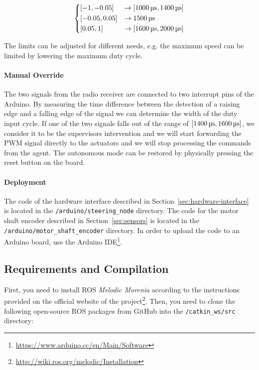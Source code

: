 \[
	\begin{dcases}
		\interval{-1}{-0.05} & \rightarrow \interval{\SI{1000}{\micro\second}}{\SI{1400}{\micro\second}} \\
		\interval{-0.05}{0.05} & \rightarrow \SI{1500}{\micro\second} \\
		\interval{0.05}{1} & \rightarrow \interval{\SI{1600}{\micro\second}}{ \SI{2000}{\micro\second}}
	\end{dcases}
\]

The limits can be adjusted for different needs, e.g. the maximum speed can be limited by lowering the maximum duty cycle.

\paragraph{Manual Override}

The two signals from the radio receiver are connected to two interrupt pins of the Arduino. By measuring the time difference between the detection of a raising edge and a falling edge of the signal we can determine the width of the duty input cycle. If one of the two signals falls out of the range of $\interval{\SI{1400}{\micro\second}}{\SI{1600}{\micro\second}}$, we consider it to be the supervisors intervention and we will start forwarding the \gls*{PWM} signal directly to the actuators and we will stop processing the commands from the agent. The autonomous mode can be restored by physically pressing the reset button on the board.

\paragraph{Deployment}

The code of the hardware interface described in Section~\ref{sec:hardware-interface} is located in the \texttt{/arduino/steering\_node} directory. The code for the motor shaft encoder described in Section~\ref{sec:sensors} is located in the \texttt{/arduino/motor\_\-shaft\_encoder} directory. In order to upload the code to an Arduino board, use the Arduino IDE\footnote{\url{https://www.arduino.cc/en/Main/Software}}.

\subsection{Requirements and Compilation}

First, you need to install \gls{ROS} \textit{Melodic Morenia} according to the instructions provided on the official website of the project\footnote{\url{http://wiki.ros.org/melodic/Installation}}. Then, you need to clone the following open-source \gls*{ROS} packages from GitHub into the \texttt{/catkin\_ws/src} directory:

